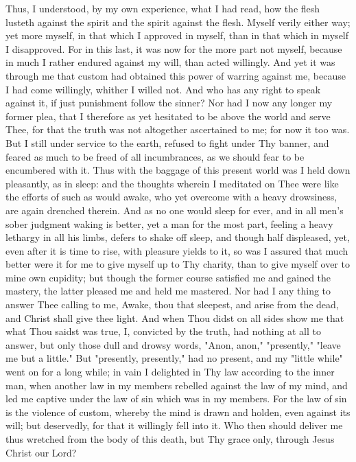 \documentclass[b5paper,openright,12pt,twoside]{book}
\begin{document}
Thus, I understood, by my own experience, what I had read, how the flesh
lusteth against the spirit and the spirit against the flesh. Myself
verily either way; yet more myself, in that which I approved in myself,
than in that which in myself I disapproved. For in this last, it was now
for the more part not myself, because in much I rather endured against
my will, than acted willingly. And yet it was through me that custom had
obtained this power of warring against me, because I had come willingly,
whither I willed not. And who has any right to speak against it, if just
punishment follow the sinner? Nor had I now any longer my former plea,
that I therefore as yet hesitated to be above the world and serve Thee,
for that the truth was not altogether ascertained to me; for now it too
was. But I still under service to the earth, refused to fight under Thy
banner, and feared as much to be freed of all incumbrances, as we should
fear to be encumbered with it. Thus with the baggage of this present
world was I held down pleasantly, as in sleep: and the thoughts wherein
I meditated on Thee were like the efforts of such as would awake, who
yet overcome with a heavy drowsiness, are again drenched therein. And as
no one would sleep for ever, and in all men's sober judgment waking is
better, yet a man for the most part, feeling a heavy lethargy in all his
limbs, defers to shake off sleep, and though half displeased, yet, even
after it is time to rise, with pleasure yields to it, so was I assured
that much better were it for me to give myself up to Thy charity, than
to give myself over to mine own cupidity; but though the former course
satisfied me and gained the mastery, the latter pleased me and held me
mastered. Nor had I any thing to answer Thee calling to me, Awake,
thou that sleepest, and arise from the dead, and Christ shall give thee
light. And when Thou didst on all sides show me that what Thou saidst
was true, I, convicted by the truth, had nothing at all to answer, but
only those dull and drowsy words, "Anon, anon," "presently," "leave
me but a little." But "presently, presently," had no present, and my
"little while" went on for a long while; in vain I delighted in Thy
law according to the inner man, when another law in my members rebelled
against the law of my mind, and led me captive under the law of sin
which was in my members. For the law of sin is the violence of custom,
whereby the mind is drawn and holden, even against its will; but
deservedly, for that it willingly fell into it. Who then should deliver
me thus wretched from the body of this death, but Thy grace only,
through Jesus Christ our Lord?
\end{document}

